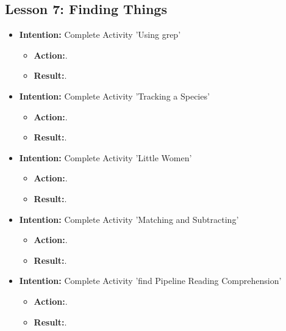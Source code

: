 \documentclass{article}
\begin{document}
\subsection{Lesson 7: Finding Things}

\begin{itemize}

\item{\textbf{Intention:} Complete Activity 'Using grep'}

\begin{itemize}
\item{\textbf{Action:}.}

\item{\textbf{Result:}.}

\end{itemize}

\item{\textbf{Intention:} Complete Activity 'Tracking a Species'}

\begin{itemize}
\item{\textbf{Action:}.}

\item{\textbf{Result:}.}

\end{itemize}

\item{\textbf{Intention:} Complete Activity 'Little Women'}

\begin{itemize}
\item{\textbf{Action:}.}

\item{\textbf{Result:}.}

\end{itemize}


\item{\textbf{Intention:} Complete Activity 'Matching and Subtracting'}

\begin{itemize}
\item{\textbf{Action:}.}

\item{\textbf{Result:}.}

\end{itemize}

\item{\textbf{Intention:} Complete Activity 'find Pipeline Reading Comprehension'}

\begin{itemize}
\item{\textbf{Action:}.}

\item{\textbf{Result:}.}

\end{itemize}

\end{itemize}
\end{document}
